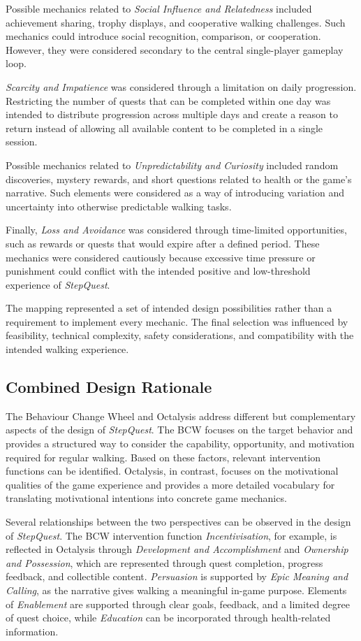Possible mechanics related to \textit{Social Influence and Relatedness} included achievement sharing, trophy displays, and cooperative walking challenges. Such mechanics could introduce social recognition, comparison, or cooperation. However, they were considered secondary to the central single-player gameplay loop.

\textit{Scarcity and Impatience} was considered through a limitation on daily progression. Restricting the number of quests that can be completed within one day was intended to distribute progression across multiple days and create a reason to return instead of allowing all available content to be completed in a single session.

Possible mechanics related to \textit{Unpredictability and Curiosity} included random discoveries, mystery rewards, and short questions related to health or the game's narrative. Such elements were considered as a way of introducing variation and uncertainty into otherwise predictable walking tasks.

Finally, \textit{Loss and Avoidance} was considered through time-limited opportunities, such as rewards or quests that would expire after a defined period. These mechanics were considered cautiously because excessive time pressure or punishment could conflict with the intended positive and low-threshold experience of \textit{StepQuest}.

The mapping represented a set of intended design possibilities rather than a requirement to implement every mechanic. The final selection was influenced by feasibility, technical complexity, safety considerations, and compatibility with the intended walking experience.

\subsection{Combined Design Rationale}

The Behaviour Change Wheel and Octalysis address different but complementary aspects of the design of \textit{StepQuest}. The BCW focuses on the target behavior and provides a structured way to consider the capability, opportunity, and motivation required for regular walking. Based on these factors, relevant intervention functions can be identified. Octalysis, in contrast, focuses on the motivational qualities of the game experience and provides a more detailed vocabulary for translating motivational intentions into concrete game mechanics.

Several relationships between the two perspectives can be observed in the design of \textit{StepQuest}. The BCW intervention function \textit{Incentivisation}, for example, is reflected in Octalysis through \textit{Development and Accomplishment} and \textit{Ownership and Possession}, which are represented through quest completion, progress feedback, and collectible content. \textit{Persuasion} is supported by \textit{Epic Meaning and Calling}, as the narrative gives walking a meaningful in-game purpose. Elements of \textit{Enablement} are supported through clear goals, feedback, and a limited degree of quest choice, while \textit{Education} can be incorporated through health-related information.

